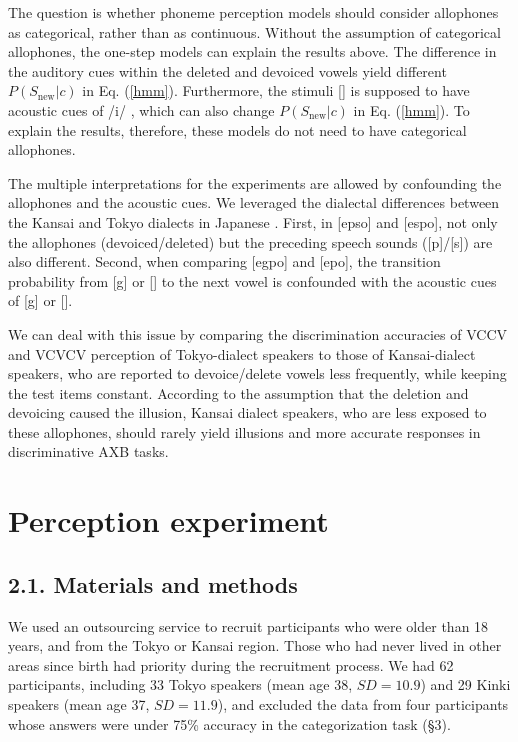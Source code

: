 \documentclass[a4paper,11pt,twocolumn]{article}
\begin{document}
The question is whether phoneme perception models should consider allophones as categorical, rather than as continuous. Without the assumption of categorical allophones, the one-step models can explain the results above. The difference in the auditory cues within the deleted and devoiced vowels yield different $P(S_{\text{new}}|c)$ in Eq. (\ref{hmm}). Furthermore, the stimuli [\textctc] is supposed to have acoustic cues of /i/ \cite{kubozono1999japanese_eng}, which can also change $P(S_{\text{new}}|c)$ in Eq. (\ref{hmm}). To explain the results, therefore, these models do not need to have categorical allophones.

The multiple interpretations for the experiments are allowed by confounding the allophones and the acoustic cues. We leveraged the dialectal differences between the Kansai and Tokyo dialects in Japanese \cite{kishiyama2022onestep}. First, in [ep\textsubring{\textturnm}so] and [espo], not only the allophones (devoiced/deleted) but the preceding speech sounds ([p]/[s]) are also different. Second, when comparing [egpo] and [e\textctc{}po], the transition probability from [g] or [\textctc] to the next vowel is confounded with the acoustic cues of [g] or [\textctc].

We can deal with this issue by comparing the discrimination accuracies of VCCV and VCVCV perception of Tokyo-dialect speakers to those of Kansai-dialect speakers, who are reported to devoice/delete vowels less frequently\cite{byun2011_eng, byun2012_eng}, while keeping the test items constant. According to the assumption that the deletion and devoicing caused the illusion, Kansai dialect speakers, who are less exposed to these allophones, should rarely yield illusions and more accurate responses in discriminative AXB tasks.

\section{Perception experiment}

\subsection{2.1. Materials and methods}

We used an outsourcing service to recruit participants who were older than 18 years, and from the Tokyo or Kansai region. Those who had never lived in other areas since birth had priority during the recruitment process. We had 62 participants, including 33 Tokyo speakers (mean age 38, $SD = 10.9$) and 29 Kinki speakers (mean age 37, $SD = 11.9$), and excluded the data from four participants whose answers were under 75\% accuracy in the categorization task (\S3).
\end{document}
